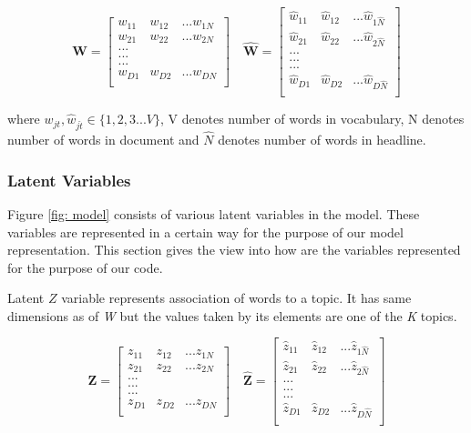 \documentclass[a4paper]{article}
\begin{document}
\[
\mathbf{W} = 
   	\begin{bmatrix}
    w_{11} & w_{12} & ... w_{1N}\\	w_{21} & w_{22} & ... w_{2N}\\ ...\\ ...\\ ...\\  w_{D1} & w_{D2} & ... w_{DN}\\ \end{bmatrix} \quad
\mathbf{\hat{W}} = 
   	\begin{bmatrix}
    \hat{w}_{11} & \hat{w}_{12} & ... \hat{w}_{1\hat{N}}\\	\hat{w}_{21} & \hat{w}_{22} & ... \hat{w}_{2\hat{N}}\\ ...\\ ...\\ ...\\  \hat{w}_{D1} & \hat{w}_{D2} & ... \hat{w}_{D\hat{N}}\\ \end{bmatrix}
\]

where $w_{jt}, \hat{w}_{j\hat{t}} \in \{1,2,3 ... V \}$, V denotes number of words in vocabulary, N denotes number of words in document and $\hat{N}$ denotes number of words in headline.

\subsubsection{Latent Variables}

Figure \ref{fig: model} consists of various latent variables in the model. These variables are represented in a certain way for the purpose of our model representation. This section gives the view into how are the variables represented for the purpose of our code. 

Latent $Z$ variable represents association of words to a topic. It has same dimensions as of \textit{W} but the values taken by its elements are one of the \textit{K} topics. 

\[
\textbf{Z} = 
   	\begin{bmatrix}
    z_{11} & z_{12} & ... z_{1N}\\	z_{21} & z_{22} & ... z_{2N}\\ ...\\ ...\\ ...\\  z_{D1} & z_{D2} & ... z_{DN}\\ \end{bmatrix} \quad
\mathbf{\hat{Z}} = 
   	\begin{bmatrix}
    \hat{z}_{11} & \hat{z}_{12} & ... \hat{z}_{1\hat{N}}\\	\hat{z}_{21} & \hat{z}_{22} & ... \hat{z}_{2\hat{N}}\\ ...\\ ...\\ ...\\  \hat{z}_{D1} & \hat{z}_{D2} & ... \hat{z}_{D\hat{N}}\\ \end{bmatrix}
\]
\end{document}
